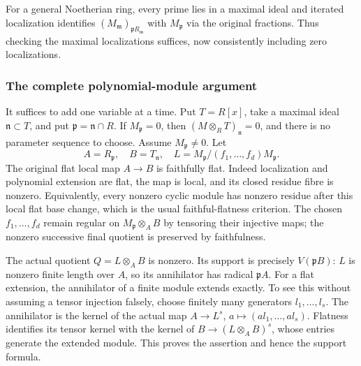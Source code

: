 For a general Noetherian ring, every prime lies in a maximal ideal and iterated localization identifies \((M_{\mathfrak m})_{\mathfrak pR_{\mathfrak m}}\) with \(M_{\mathfrak p}\) via the original fractions. Thus checking the maximal localizations suffices, now consistently including zero localizations.

\subsubsection{The complete polynomial-module argument}\label{algebra-proof-019-the-complete-polynomial-module-argument}

It suffices to add one variable at a time. Put \(T=R[x]\), take a maximal ideal \(\mathfrak n\subset T\), and put \(\mathfrak p=\mathfrak n\cap R\). If \(M_{\mathfrak p}=0\), then \((M\otimes_R T)_{\mathfrak n}=0\), and there is no parameter sequence to choose. Assume \(M_{\mathfrak p}\ne0\). Let \[
 A=R_{\mathfrak p},\quad B=T_{\mathfrak n},\quad
 L=M_{\mathfrak p}/(f_1,\ldots,f_d)M_{\mathfrak p}.
\] The original flat local map \(A\to B\) is faithfully flat. Indeed localization and polynomial extension are flat, the map is local, and its closed residue fibre is nonzero. Equivalently, every nonzero cyclic module has nonzero residue after this local flat base change, which is the usual faithful-flatness criterion. The chosen \(f_1,\ldots,f_d\) remain regular on \(M_{\mathfrak p}\otimes_A B\) by tensoring their injective maps; the nonzero successive final quotient is preserved by faithfulness.

The actual quotient \(Q=L\otimes_A B\) is nonzero. Its support is precisely \(V(\mathfrak pB)\): \(L\) is nonzero finite length over \(A\), so its annihilator has radical \(\mathfrak pA\). For a flat extension, the annihilator of a finite module extends exactly. To see this without assuming a tensor injection falsely, choose finitely many generators \(l_1,\ldots,l_s\). The annihilator is the kernel of the actual map \(A\to L^s\), \(a\mapsto(al_1,\ldots,al_s)\). Flatness identifies its tensor kernel with the kernel of \(B\to(L\otimes_A B)^s\), whose entries generate the extended module. This proves the assertion and hence the support formula.

